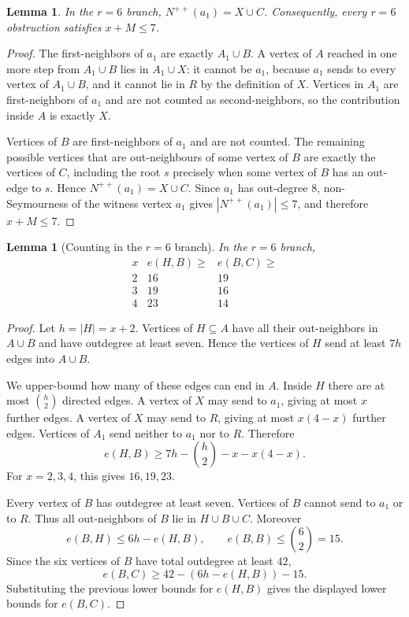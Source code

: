 \documentclass[a4paper,fleqn]{cas-sc}
\newtheorem{lemma}[theorem]{Lemma}
\theoremstyle{definition}
\begin{document}
\begin{lemma}\label{lem:r6-a1-exact}
In the $r=6$ branch, $N^{++}(a_1)=X\cup C$. Consequently, every $r=6$ obstruction satisfies $x+M\le 7$.

\end{lemma}
\begin{proof}
The first-neighbors of $a_1$ are exactly $A_1\cup B$.  A vertex of $A$ reached in one more step from $A_1\cup B$ lies in $A_1\cup X$: it cannot be $a_1$, because $a_1$ sends to every vertex of $A_1\cup B$, and it cannot lie in $R$ by the definition of $X$.  Vertices in $A_1$ are first-neighbors of $a_1$ and are not counted as second-neighbors, so the contribution inside $A$ is exactly $X$.

Vertices of $B$ are first-neighbors of $a_1$ and are not counted.  The remaining possible vertices that are out-neighbours of some vertex of $B$ are exactly the vertices of $C$, including the root $s$ precisely when some vertex of $B$ has an out-edge to $s$.  Hence $N^{++}(a_1)=X\cup C$.  Since $a_1$ has out-degree $8$, non-Seymourness of the witness vertex $a_1$ gives $|N^{++}(a_1)|\le 7$, and therefore $x+M\le 7$.
\end{proof}

\begin{lemma}[Counting in the $r=6$ branch]\label{lem:r6-counting}
In the $r=6$ branch,
\[
\begin{array}{c|cc}
 x & e(H,B)\ge & e(B,C)\ge\\ \hline
 2&16&19\\
 3&19&16\\
 4&23&14
\end{array}
\]
\end{lemma}
\begin{proof}
Let $h=|H|=x+2$.  Vertices of $H\subseteq A$ have all their out-neighbors in $A\cup B$ and have outdegree at least seven.  Hence the vertices of $H$ send at least $7h$ edges into $A\cup B$.

We upper-bound how many of these edges can end in $A$.  Inside $H$ there are at most $\binom{h}{2}$ directed edges.  A vertex of $X$ may send to $a_1$, giving at most $x$ further edges.  A vertex of $X$ may send to $R$, giving at most $x(4-x)$ further edges.  Vertices of $A_1$ send neither to $a_1$ nor to $R$.  Therefore
\[
e(H,B)\ge 7h-\binom{h}{2}-x-x(4-x).
\]
For $x=2,3,4$, this gives $16,19,23$.

Every vertex of $B$ has outdegree at least seven.  Vertices of $B$ cannot send to $a_1$ or to $R$.  Thus all out-neighbors of $B$ lie in $H\cup B\cup C$.  Moreover
\[
e(B,H)\le 6h-e(H,B),
\qquad e(B,B)\le \binom{6}{2}=15.
\]
Since the six vertices of $B$ have total outdegree at least $42$,
\[
e(B,C)\ge 42-(6h-e(H,B))-15.
\]
Substituting the previous lower bounds for $e(H,B)$ gives the displayed lower bounds for $e(B,C)$.
\end{proof}
\end{document}
